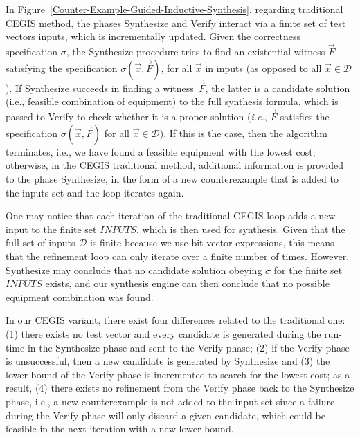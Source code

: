 \documentclass[runningheads]{llncs}
\begin{document}
In Figure~\ref{Counter-Example-Guided-Inductive-Synthesis}, regarding traditional CEGIS method, the phases {\sc Synthesize} and {\sc Verify} interact via a finite set of test vectors {\sc inputs}, which is incrementally updated. Given the correctness specification $\sigma$, the {\sc Synthesize} procedure tries to find an existential witness $\vec{F}$ satisfying the specification $\sigma(\vec{x}, \vec{F})$, for all $\vec{x}$ in {\sc inputs} (as opposed to all $\vec{x} \in \mathcal{D}$). If {\sc Synthesize} succeeds in finding a witness~$\vec{F}$, the latter is a candidate solution (i.e., feasible combination of equipment) to the full synthesis formula, which is passed to {\sc Verify} to check whether it is a proper solution ({\it i.e.}, $\vec{F}$ satisfies the specification $\sigma(\vec{x}, \vec{F})$ for all $\vec{x}\in\mathcal{D}$). If this is the case, then the algorithm terminates, i.e., we have found a feasible equipment with the lowest cost; otherwise, in the CEGIS traditional method, additional information is provided to the phase {\sc Synthesize}, in the form of a new counterexample that is added to the {\sc inputs} set and the loop iterates again.

One may notice that each iteration of the traditional CEGIS loop adds a new input to the finite set $INPUTS$, which is then used for synthesis. Given that the full set of inputs $\mathcal{D}$ is finite because we use bit-vector expressions, this means that the refinement loop can only iterate over a finite number of times. However, {\sc Synthesize} may conclude that no candidate solution obeying $\sigma$ for the finite set $INPUTS$ exists, and our synthesis engine can then conclude that no possible equipment combination was found.

In our CEGIS variant, there exist four differences related to the traditional one: 
(1) there exists no test vector and every candidate is generated during the run-time in the {\sc Synthesize} phase and sent to the {\sc Verify} phase; 
(2) if the {\sc Verify} phase is unsuccessful, then a new candidate is generated by {\sc Synthesize} and 
(3) the lower bound of the {\sc Verify} phase is incremented to search for the lowest cost; as a result,
(4) there exists no refinement from the {\sc Verify} phase back to the {\sc Synthesize} phase, i.e., 
a new counterexample is not added to the {\sc input} set since a failure during the {\sc Verify} phase will only discard a given candidate, which could be feasible in the next iteration with a new lower bound.%

\end{document}

